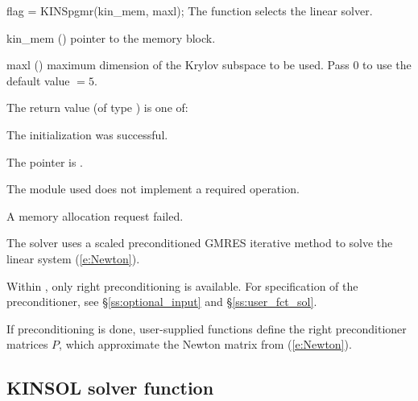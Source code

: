 {
  flag = KINSpgmr(kin\_mem, maxl);
}
{
  The function  selects the {\kinspgmr} linear solver. 
}
{
  \begin{args}
  \item[kin\_mem] ()
    pointer to the {\kinsol} memory block.
  \item[maxl] ()
    maximum dimension of the Krylov subspace to be used. Pass $0$ to use the 
    default value $=5$.
  \end{args}
}
{
  The return value  (of type ) is one of:
  \begin{args}
  \item[\Id{KINSPGMR\_SUCCESS}] 
    The {\kinspgmr} initialization was successful.
  \item[\Id{KINSPGMR\_MEM\_NULL}]
    The  pointer is .
  \item[\Id{KINSPGMR\_ILL\_INPUT}]
    The {\nvector} module used does not implement a required operation.
  \item[\Id{KINSPGMR\_MEM\_FAIL}]
    A memory allocation request failed.
  \end{args}
}
{
  The {\kinspgmr} solver uses a scaled preconditioned GMRES
  iterative method to solve the linear system (\ref{e:Newton}).

  Within {\kinsol}, only right preconditioning is available.
  For specification of the preconditioner,
  see \S\ref{ss:optional_input} and \S\ref{ss:user_fct_sol}.

  If preconditioning is done, user-supplied functions define the right 
  preconditioner matrices $P$, which approximate the Newton matrix
  from (\ref{e:Newton}).
}

\subsection{KINSOL solver function}\label{ss:kinsol}

